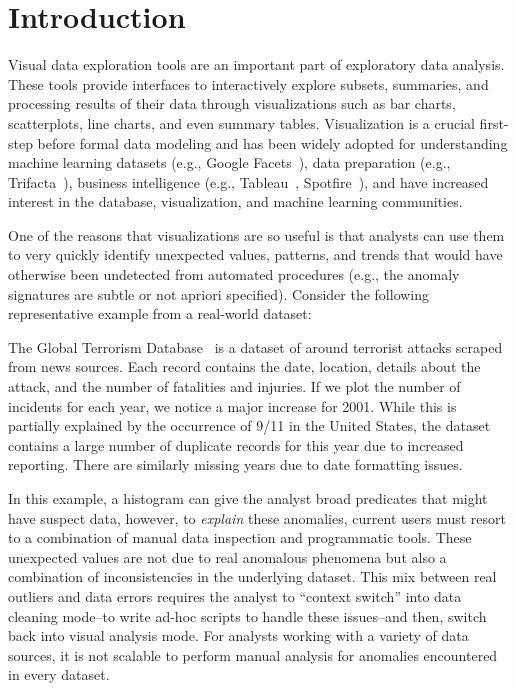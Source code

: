 \section{Introduction}\label{intro}\sloppy
Visual data exploration tools are an important part of exploratory 
data analysis. These tools provide interfaces to interactively explore subsets, summaries, and processing results of their data through visualizations such as bar charts, scatterplots, line charts, and even summary tables.  Visualization is a crucial first-step before formal data modeling and has been widely adopted for understanding machine learning datasets (e.g., Google Facets~\cite{googlefacets}), data preparation (e.g., Trifacta~\cite{trifacta}), business intelligence (e.g., Tableau~\cite{stolte2002polaris}, Spotfire~\cite{shneiderman1999dynamic}), and have increased interest in the database, visualization, and machine learning communities. 

One of the reasons that visualizations are so useful is that analysts can use them to very quickly identify unexpected values, patterns, and trends that would have otherwise been undetected from automated procedures (e.g., the anomaly signatures are subtle or not apriori specified).  Consider the following representative example from a real-world dataset: 

\begin{example}[Terrorism]
The Global Terrorism Database~\cite{data-terrorism} is a dataset of around terrorist attacks scraped from news sources.  Each record contains the date, location, details about the attack, and the number of fatalities and injuries.  If we plot the number of incidents for each year, we notice a major increase for 2001. While this is partially explained by the occurrence of 9/11 in the United States, the dataset contains a large number of duplicate records for this year due to increased reporting. There are similarly missing years due to date formatting issues.
\label{e:terrorism}
\end{example}

In this example, a histogram can give the analyst broad predicates that might have suspect data, however, to {\it explain} these anomalies, current users must resort to a combination of manual data inspection and programmatic tools. These unexpected values are not due to real anomalous phenomena but also a combination of inconsistencies in the underlying dataset.  This mix between real outliers and data errors requires the analyst to ``context switch'' into data cleaning mode--to write ad-hoc scripts to handle these issues--and then, switch back into visual analysis mode. For analysts working with a variety of data sources, it is not scalable to perform manual analysis for anomalies encountered in every dataset.

